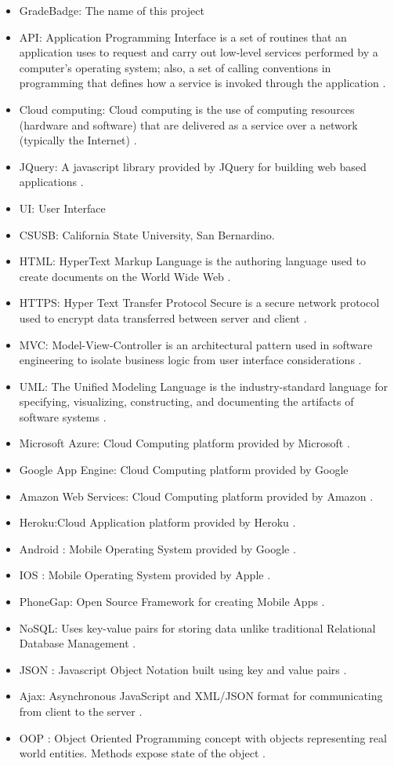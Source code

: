 \begin{itemize}
\item GradeBadge: The name of this project
\item API: Application Programming Interface is a set of routines that an application uses to request and carry out low-level services performed by a computer's operating system; also, a set of calling conventions in programming that defines how a service is invoked through the application \cite{API}.
\item Cloud computing: Cloud computing is the use of computing resources (hardware and software) that are delivered as a service over a network (typically the Internet) \cite{cloudcomputing}.
\item JQuery: A javascript library provided by JQuery for building web based applications \cite{JQuery}.
\item UI: User Interface
\item CSUSB: California State University, San Bernardino.
\item HTML: HyperText Markup Language is the authoring language used to create documents on the World Wide Web \cite{w3}.
\item HTTPS: Hyper Text Transfer Protocol Secure is a secure network protocol used to encrypt data transferred  between server and client \cite{https}.
\item MVC\label{def:mvc}: Model-View-Controller is an architectural pattern used in software engineering to isolate business logic from user interface considerations \cite{mvc}.
\item UML: The Unified Modeling Language is the industry-standard language for specifying, visualizing, constructing, and documenting the artifacts of software systems \cite{uml}.
\item Microsoft Azure: Cloud Computing platform provided by Microsoft \cite{MicrosoftAzure}.
\item Google App Engine: Cloud Computing platform provided by Google 
\item Amazon Web Services: Cloud Computing platform provided by Amazon \cite{AWS}.
\item Heroku:Cloud Application platform provided by Heroku \cite{Heroku}.
\item Android : Mobile Operating System provided by Google \cite{Android}.
\item IOS : Mobile Operating System provided by Apple \cite{IOS}.
\item PhoneGap: Open Source Framework for creating Mobile Apps \cite{PhoneGap}.
\item NoSQL: Uses key-value pairs for storing data unlike traditional Relational Database Management \cite{NoSql}.
\item JSON : Javascript Object Notation built using key and value pairs \cite{json}.
\item Ajax:  Asynchronous JavaScript and XML/JSON format for communicating from client to the server \cite{Ajax}.
\item OOP : Object Oriented Programming concept with objects representing real world entities. Methods expose state of the object \cite{OOP}.
\end{itemize}


